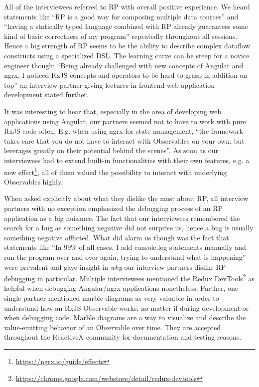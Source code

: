 \documentclass[12pt,a4paper]{article}
\begin{document}
All of the interviewees referred to RP with overall positive experience. We heard statements like ``RP is a good way for composing multiple data sources'' and ``having a statically typed language combined with RP already guarantees some kind of basic correctness of my program'' repeatedly throughout all sessions. Hence a big strength of RP seems to be the ability to describe complex dataflow constructs using a specialized DSL. The learning curve can be steep for a novice engineer though: ``Being already challenged with new concepts of Angular and ngrx, I noticed RxJS concepts and operators to be hard to grasp in addition on top'' an interview partner giving lectures in frontend web application development stated further.

It was interesting to hear that, especially in the area of developing web applications using Angular, our partners seemed not to have to work with pure RxJS code often. E.g. when using ngrx for state management, ``the framework takes care that you do not have to interact with Observables on your own, but leverages greatly on their potential behind the scenes''. As soon as our interviewees had to extend built-in functionalities with their own features, e.g. a new effect\footnote{\url{https://ngrx.io/guide/effects}}, all of them valued the possibility to interact with underlying Observables highly.

When asked explicitly about what they dislike the most about RP, all interview partners with no exception emphasized the debugging process of an RP application as a big nuisance. The fact that our interviewees remembered the search for a bug as something negative did not surprise us, hence a bug is usually something negative afflicted. What did alarm us though was the fact that statements like ``In 99\% of all cases, I add console.log statements manually and run the program over and over again, trying to understand what is happening'' were prevalent and gave insight in \emph{why} our interview partners dislike RP debugging in particular. Multiple interviewees mentioned the Redux DevTools\footnote{\url{https://chrome.google.com/webstore/detail/redux-devtools}} as helpful when debugging Angular/ngrx applications nonetheless. Further, one single partner mentioned marble diagrams as very valuable in order to understand how an RxJS Observable works, no matter if during development or when debugging code. Marble diagrams are a way to visualize and describe the value-emitting behavior of an Observable over time. They are accepted throughout the ReactiveX community for documentation\cite{marblediagrams} and testing reasons\cite{marbletesting}.
\end{document}
